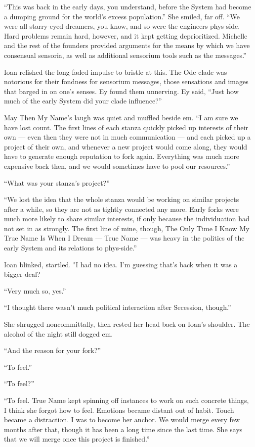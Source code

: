 ``This was back in the early days, you understand, before the System had become a dumping ground for the world's excess population.'' She smiled, far off. ``We were all starry-eyed dreamers, you know, and so were the engineers phys-side. Hard problems remain hard, however, and it kept getting deprioritized. Michelle and the rest of the founders provided arguments for the means by which we have consensual sensoria, as well as additional sensorium tools such as the messages.''

Ioan relished the long-faded impulse to bristle at this. The Ode clade was notorious for their fondness for sensorium messages, those sensations and images that barged in on one's senses. Ey found them unnerving. Ey said, ``Just how much of the early System did your clade influence?''

May Then My Name's laugh was quiet and muffled beside em. ``I am sure we have lost count. The first lines of each stanza quickly picked up interests of their own — even then they were not in much communication — and each picked up a project of their own, and whenever a new project would come along, they would have to generate enough reputation to fork again. Everything was much more expensive back then, and we would sometimes have to pool our resources.''

``What was your stanza's project?''

``We lost the idea that the whole stanza would be working on similar projects after a while, so they are not as tightly connected any more. Early forks were much more likely to share similar interests, if only because the individuation had not set in as strongly. The first line of mine, though, The Only Time I Know My True Name Is When I Dream — True Name — was heavy in the politics of the early System and its relations to phys-side.''

Ioan blinked, startled. "I had no idea. I'm guessing that's back when it was a bigger deal?

``Very much so, yes.''

``I thought there wasn't much political interaction after Secession, though.''

She shrugged noncommittally, then rested her head back on Ioan's shoulder. The alcohol of the night still dogged em.

``And the reason for your fork?''

``To feel.''

``To feel?''

``To feel. True Name kept spinning off instances to work on such concrete things, I think she forgot how to feel. Emotions became distant out of habit. Touch became a distraction. I was to become her anchor. We would merge every few months after that, though it has been a long time since the last time. She says that we will merge once this project is finished.''

